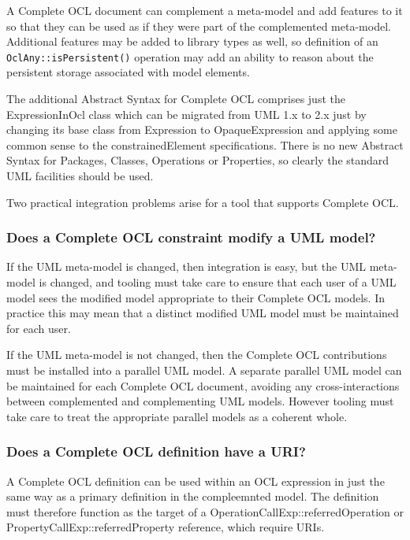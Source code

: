 \documentclass{eceasst}
\begin{document}
A Complete OCL document can complement a meta-model and add features to it so that they can be used as if they were part of the complemented meta-model. Additional features may be added to library types as well, so definition of an \verb|OclAny::isPersistent()| operation may add an ability to reason about the persistent storage associated with model elements.

The additional Abstract Syntax for Complete OCL comprises just the ExpressionInOcl class which can be migrated from UML 1.x to 2.x just by changing its base class from Expression to OpaqueExpression and applying some common sense to the constrainedElement specifications. There is no new Abstract Syntax for Packages, Classes, Operations or Properties, so clearly the standard UML facilities should be used.

Two practical integration problems arise for a tool that supports Complete OCL.

\subsubsection{Does a Complete OCL constraint modify a UML model?}

If the UML meta-model is changed, then integration is easy, but the UML meta-model is changed, and tooling must take care to ensure that each user of a UML model sees the modified model appropriate to their Complete OCL models. In practice this may mean that a distinct modified UML model must be maintained for each user.

If the UML meta-model is not changed, then the Complete OCL contributions must be installed into a parallel UML model. A separate parallel UML model can be maintained for each Complete OCL document, avoiding any cross-interactions between complemented and complementing UML models. However tooling must take care to treat the appropriate parallel models as a coherent whole.

\subsubsection{Does a Complete OCL definition have a URI?}

A Complete OCL definition can be used within an OCL expression in just the same way as a primary definition in the compleemnted model. The definition must therefore function as the target of a OperationCallExp::referredOperation or PropertyCallExp::referredProperty reference, which require URIs.
\end{document}

